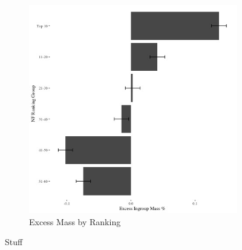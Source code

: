 \documentclass[12pt,letterpaper]{article}
\begin{document}
\begin{figure}[ht]
\begin{subfigure}{.5\textwidth}
        \includegraphics[width=.9\linewidth]{Output/Graphs/Audit/Excess Mass/US NF excess mass by ranking group.jpg}  
        \caption{Excess Mass by Ranking}
        \label{fig:sub-second}
    \end{subfigure}
\caption{Stuff}
\end{figure}
\end{document}
